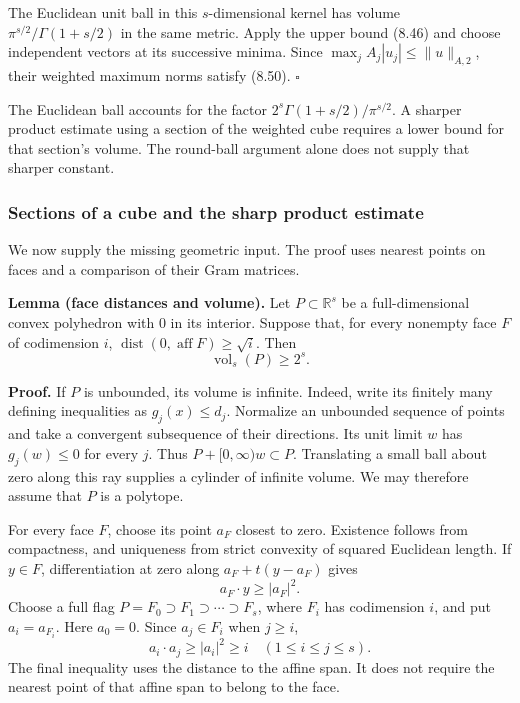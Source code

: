 \documentclass[
  11pt,
  a4paper,
]{article}
\begin{document}
The Euclidean unit ball in this \(s\)-dimensional kernel has volume
\(\pi^{s/2}/\Gamma(1+s/2)\) in the same metric. Apply the upper bound
(8.46) and choose independent vectors at its successive minima. Since
\(\max_j A_j|u_j|\le\|u\|_{A,2}\), their weighted maximum norms satisfy
(8.50). \(\square\)

The Euclidean ball accounts for the factor
\(2^s\Gamma(1+s/2)/\pi^{s/2}\). A sharper product estimate using a
section of the weighted cube requires a lower bound for that section's
volume. The round-ball argument alone does not supply that sharper
constant.

\subsubsection{Sections of a cube and the sharp product
estimate}\label{sections-of-a-cube-and-the-sharp-product-estimate}

We now supply the missing geometric input. The proof uses nearest points
on faces and a comparison of their Gram matrices.

\textbf{Lemma (face distances and volume).} Let \(P\subset\mathbb R^s\)
be a full-dimensional convex polyhedron with \(0\) in its interior.
Suppose that, for every nonempty face \(F\) of codimension \(i\),
\(\operatorname{dist}(0,\operatorname{aff}F)\ge\sqrt i\). Then \[
\operatorname{vol}_s(P)\ge2^s.
\tag{8.51}
\]

\textbf{Proof.} If \(P\) is unbounded, its volume is infinite. Indeed,
write its finitely many defining inequalities as \(g_j(x)\le d_j\).
Normalize an unbounded sequence of points and take a convergent
subsequence of their directions. Its unit limit \(w\) has \(g_j(w)\le0\)
for every \(j\). Thus \(P+[0,\infty)w\subset P\). Translating a small
ball about zero along this ray supplies a cylinder of infinite volume.
We may therefore assume that \(P\) is a polytope.

For every face \(F\), choose its point \(a_F\) closest to zero.
Existence follows from compactness, and uniqueness from strict convexity
of squared Euclidean length. If \(y\in F\), differentiation at zero
along \(a_F+t(y-a_F)\) gives \[
a_F\cdot y\ge |a_F|^2.
\] Choose a full flag \(P=F_0\supset F_1\supset\cdots\supset F_s\),
where \(F_i\) has codimension \(i\), and put \(a_i=a_{F_i}\). Here
\(a_0=0\). Since \(a_j\in F_i\) when \(j\ge i\), \[
a_i\cdot a_j\ge |a_i|^2\ge i
\quad(1\le i\le j\le s).
\tag{8.52}
\] The final inequality uses the distance to the affine span. It does
not require the nearest point of that affine span to belong to the face.
\end{document}
